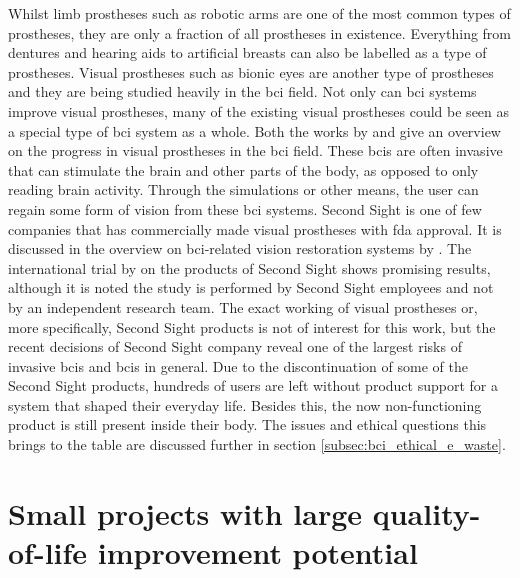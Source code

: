 Whilst limb prostheses such as robotic arms are one of the most common types of prostheses, they are only a fraction of all prostheses in existence.
Everything from dentures and hearing aids to artificial breasts can also be labelled as a type of prostheses.
Visual prostheses such as bionic eyes are another type of prostheses and they are being studied heavily in the \gls{bci} field.
Not only can \gls{bci} systems improve visual prostheses, many of the existing visual prostheses could be seen as a special type of \gls{bci} system as a whole.
Both the works by \citet{bci_blind_assist_review} and \citet{bci_vision_assist_review} give an overview on the progress in visual prostheses in the \gls{bci} field.
These \glspl{bci} are often invasive that can stimulate the brain and other parts of the body, as opposed to only reading brain activity.
Through the simulations or other means, the user can regain some form of vision from these \gls{bci} systems.
Second Sight is one of few companies that has commercially made visual prostheses with \gls{fda} approval.
It is discussed in the overview on \gls{bci}-related vision restoration systems by \citet{bci_vision_assist_review}.
The international trial by \citet{second_sight_trial} on the products of Second Sight shows promising results, although it is noted the study is performed by Second Sight employees and not by an independent research team.
The exact working of visual prostheses or, more specifically, Second Sight products is not of interest for this work, but the recent decisions of Second Sight company reveal one of the largest risks of invasive \glspl{bci} and \glspl{bci} in general.
Due to the discontinuation of some of the Second Sight products, hundreds of users are left without product support for a system that shaped their everyday life.
Besides this, the now non-functioning product is still present inside their body.
The issues and ethical questions this brings to the table are discussed further in section \ref{subsec:bci_ethical_e_waste}.


\section{Small projects with large quality-of-life improvement potential}
\label{sec:bci_small_projects}

